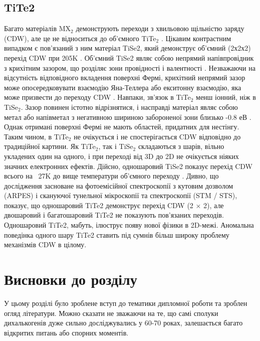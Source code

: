 \subsection{TiTe2}
Багато матеріалів MX$_2$ демонструють переходи з хвильовою щільністю заряду (CDW), але це не відноситься до об'ємного TiTe$_2$ \cite{PhysRevB29,TiTe2_2, TiTe2_3, TiTe2_4}. Цікавим контрастним випадком є пов'язаний з ним матеріал TiSe2, який демонструє об'ємний (2х2х2) перехід CDW при 205K \cite{TiTe2_5}. Об'ємний TiSe2 являє собою непрямий напівпровідник з крихітним зазором, що розділяє зони провідності і валентності \cite{TiTe2_6}. Незважаючи на відсутність відповідного вкладення поверхні Фермі, крихітний непрямий зазор може опосередковувати взаємодію Яна-Теллера або екситонну взаємодію, яка може призвести до переходу CDW \cite{TiTe2_6}. Навпаки, зв'язок в TiTe$_2$ менш іонний, ніж в TiSe$_2$. Зазор повинен істотно відрізнятися, і насправді матеріал являє собою метал або напівметал з негативною шириною забороненої зони близько -0.8 $еВ$ \cite{PhysRevB.54.2453}. Однак отримані поверхні Фермі не мають областей, придатних для нестінгу. Таким чином, в TiTe$_2$ не очікується і не спостерігається CDW відповідно до традиційної картини. Як TiTe$_2$, так і TiSe$_2$ складаються з шарів, вільно укладених один на одного, і при переході від 3D до 2D не очікується ніяких значних електронних ефектів. Дійсно, одношаровий TiSe2 показує перехід CDW всього на ~27K до вище температури об'ємного переходу \cite{TiTe2_7}.
Дивно, що дослідження засноване на фотоемісійної спектроскопії з кутовим дозволом (ARPES) і скануючої тунельної мікроскопії та спектроскопії (STM / STS), показує, що одношаровий TiTe2 демонструє перехід CDW (2 × 2), але двошаровий і багатошаровий TiTe2 не показують пов'язаних переходів. Одношаровий TiTe2, мабуть, ілюструє появу нової фізики в 2D-межі. Аномальна поведінка одного шару TiTe2 ставить під сумнів більш широку проблему механізмів CDW в цілому.
\section{Висновки до розділу} 
У цьому розділі було зроблене вступ до тематики дипломної роботи та зроблен огляд літератури. Можно сказати не зважаючи на те, що самі сполуки дихалькогенів дуже сильно досліджувались у 60-70 роках, залешається багато відкритих питань або спорних моментів. 
